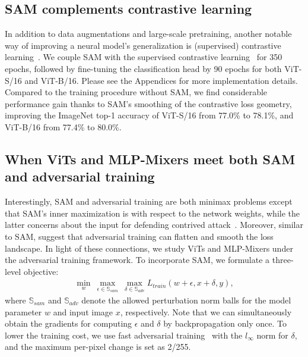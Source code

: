 \documentclass{article}
\begin{document}
\subsection{SAM complements contrastive learning}
\label{sec:contrastive}
In addition to data augmentations and large-scale pretraining, another notable way of improving a neural model's generalization is (supervised) contrastive learning~\cite{chen2020simclr,He2020moco,caron2021emerging,khosla2020supcon}. We couple SAM with the supervised contrastive learning~\cite{khosla2020supcon} for 350 epochs, followed by fine-tuning the classification head by 90 epochs for both ViT-S/16 and ViT-B/16.
Please see the Appendices for more implementation details. Compared to the training procedure without SAM, we find considerable performance gain thanks to SAM's smoothing of the contrastive loss geometry, improving the ImageNet top-1 accuracy of ViT-S/16 from 77.0\% to 78.1\%, and ViT-B/16 from 77.4\% to 80.0\%.


\subsection{When ViTs and MLP-Mixers meet both SAM and adversarial training}
Interestingly, SAM and adversarial training are both minimax problems except that SAM's inner maximization is with respect to the network weights, while the latter concerns about the input for defending contrived attack~\cite{madry2018towards, Wong2020Fast}.
Moreover, similar to SAM, \citet{shafahi2019free} suggest that adversarial training can flatten and smooth the loss landscape. In light of these connections,  we study ViTs and MLP-Mixers under the adversarial training framework.
To incorporate SAM, we formulate a three-level objective:
\begin{align}
    \min_w\ \max_{\epsilon \in \mathbb{S}_{sam}}\ \max_{\delta \in \mathbb{S}_{adv}} L_{train}(w+\epsilon, x+\delta, y),
\end{align}
where $\mathbb{S}_{sam}$ and $\mathbb{S}_{adv}$ denote the allowed perturbation norm balls for the model parameter $w$ and input image $x$, respectively.
Note that we can simultaneously obtain the gradients for computing $\epsilon$ and $\delta$ by backpropagation only once.
To lower the training cost,  we use fast adversarial training~\cite{Wong2020Fast} with the $l_\infty$ norm for $\delta$, and the maximum per-pixel change is set as 2/255. 
\end{document}
